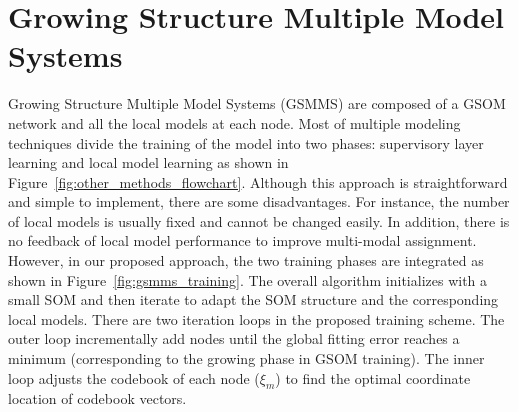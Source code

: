 \documentclass[review,3p]{elsarticle}
\renewcommand\[{\begin{equation}}
\renewcommand\]{\end{equation}}
\begin{document}
\section{Growing Structure Multiple Model Systems}
 Growing Structure Multiple Model Systems (GSMMS) are composed of a GSOM network and all the local models at each node. Most of multiple modeling techniques divide the training of the model into two phases: supervisory layer learning and local model
learning as shown in Figure~\ref{fig:other_methods_flowchart}. Although this approach is straightforward and simple to implement, there are some disadvantages. For instance, the number of local models is usually fixed and
cannot be changed easily. In addition, there is no feedback of local model performance to improve multi-modal assignment. However, in our proposed approach, the two training phases are integrated as shown in
Figure~\ref{fig:gsmms_training}. The overall algorithm initializes with a
small SOM and then iterate to adapt the SOM structure and the corresponding
local models. There are two iteration loops in the proposed training scheme. The outer loop incrementally add nodes until the global fitting error reaches a minimum (corresponding to the growing phase in GSOM training). The inner loop adjusts
the codebook of each node ($\xi_m$) to find the optimal coordinate location of codebook vectors.
\end{document}
